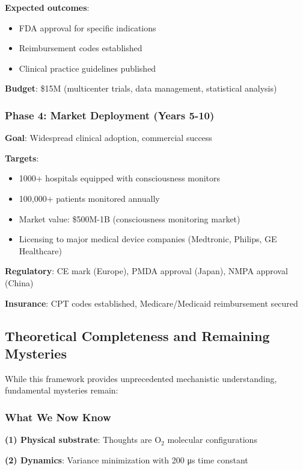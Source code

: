 \documentclass[11pt,onecolumn]{article}
\begin{document}
\textbf{Expected outcomes}:
\begin{itemize}
\item FDA approval for specific indications
\item Reimbursement codes established
\item Clinical practice guidelines published
\end{itemize}

\textbf{Budget}: \$15M (multicenter trials, data management, statistical analysis)

\subsubsection{Phase 4: Market Deployment (Years 5-10)}

\textbf{Goal}: Widespread clinical adoption, commercial success

\textbf{Targets}:
\begin{itemize}
\item 1000+ hospitals equipped with consciousness monitors
\item 100,000+ patients monitored annually
\item Market value: \$500M-1B (consciousness monitoring market)
\item Licensing to major medical device companies (Medtronic, Philips, GE Healthcare)
\end{itemize}

\textbf{Regulatory}: CE mark (Europe), PMDA approval (Japan), NMPA approval (China)

\textbf{Insurance}: CPT codes established, Medicare/Medicaid reimbursement secured

\subsection{Theoretical Completeness and Remaining Mysteries}

While this framework provides unprecedented mechanistic understanding, fundamental mysteries remain:

\subsubsection{What We Now Know}

\textbf{(1) Physical substrate}: Thoughts are O$_2$ molecular configurations

\textbf{(2) Dynamics}: Variance minimization with 200 μs time constant
\end{document}
